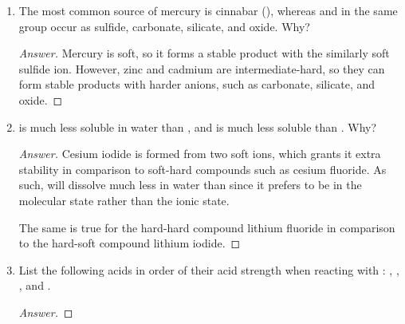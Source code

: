 \documentclass[../psets.tex]{subfiles}
\begin{document}
\begin{enumerate}[label={\Roman*)}]
\begin{enumerate}[label={\textbf{6.\arabic*}}]
\begin{enumerate}[label={\textbf{\alph*.}}]
\begin{proof}[Answer]
            \end{proof}
            \item Propose a structure of the product.
            \begin{proof}[Answer]
                ${\color{white}hi}$
                \begin{center}
                \end{center}
            \end{proof}
        \end{enumerate}
        \newpage
        \setcounter{enumii}{24}
        \item The most common source of mercury is cinnabar (), whereas  and  in the same group occur as sulfide, carbonate, silicate, and oxide. Why?
        \begin{proof}[Answer]
            Mercury is soft, so it forms a stable product with the similarly soft sulfide ion. However, zinc and cadmium are intermediate-hard, so they can form stable products with harder anions, such as carbonate, silicate, and oxide.
        \end{proof}
        \newpage
        \setcounter{enumii}{29}
        \item {} is much less soluble in water than , and  is much less soluble than . Why?
        \begin{proof}[Answer]
            Cesium iodide is formed from two soft ions, which grants it extra stability in comparison to soft-hard compounds such as cesium fluoride. As such,  will dissolve much less in water than  since it prefers to be in the molecular state rather than the ionic state.\par
            The same is true for the hard-hard compound lithium fluoride in comparison to the hard-soft compound lithium iodide.
        \end{proof}
        \newpage
        \setcounter{enumii}{36}
        \item List the following acids in order of their acid strength when reacting with : , , , and .
        \begin{proof}[Answer]

\end{proof}
\end{enumerate}
\end{enumerate}
\end{document}
